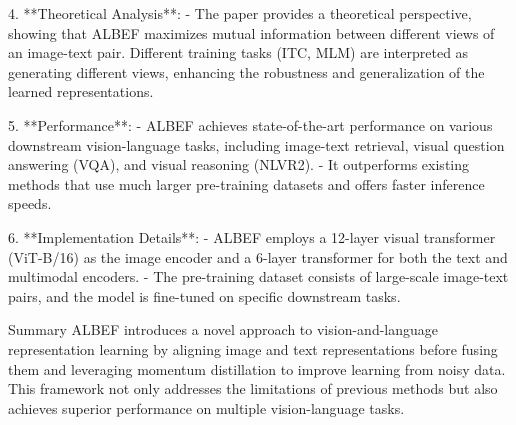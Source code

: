 4. **Theoretical Analysis**:
   - The paper provides a theoretical perspective, showing that ALBEF maximizes mutual information between different views of an image-text pair. Different training tasks (ITC, MLM) are interpreted as generating different views, enhancing the robustness and generalization of the learned representations.

5. **Performance**:
   - ALBEF achieves state-of-the-art performance on various downstream vision-language tasks, including image-text retrieval, visual question answering (VQA), and visual reasoning (NLVR2).
   - It outperforms existing methods that use much larger pre-training datasets and offers faster inference speeds.

6. **Implementation Details**:
   - ALBEF employs a 12-layer visual transformer (ViT-B/16) as the image encoder and a 6-layer transformer for both the text and multimodal encoders.
   - The pre-training dataset consists of large-scale image-text pairs, and the model is fine-tuned on specific downstream tasks.

 Summary
ALBEF introduces a novel approach to vision-and-language representation learning by aligning image and text representations before fusing them and leveraging momentum distillation to improve learning from noisy data. This framework not only addresses the limitations of previous methods but also achieves superior performance on multiple vision-language tasks.
